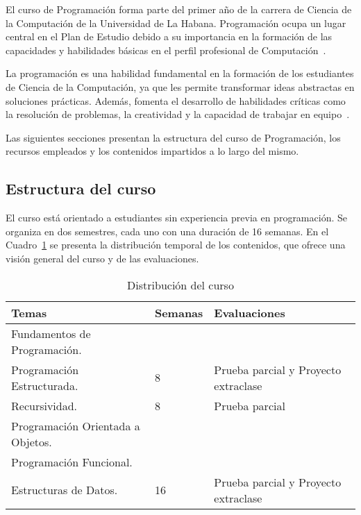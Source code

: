 El curso de Programación forma parte del primer año de la carrera de Ciencia de la Computación de la Universidad de La Habana. Programación ocupa un lugar central en el Plan de Estudio debido a su importancia en la formación de las capacidades y habilidades básicas en el perfil profesional de Computación~\cite{plan_estudio_e_2017}.

La programación es una habilidad fundamental en la formación de los estudiantes de Ciencia de la Computación, ya que les permite transformar ideas abstractas en soluciones prácticas. Además, fomenta el desarrollo de habilidades críticas como la resolución de problemas, la creatividad y la capacidad de trabajar en equipo~\cite{plan_estudio_e_2017}.

Las siguientes secciones presentan la estructura del curso de Programación, los recursos empleados y los contenidos impartidos a lo largo del mismo.

\subsection{Estructura del curso}

El curso está orientado a estudiantes sin experiencia previa en programación. Se organiza en dos semestres, cada uno con una duración de 16 semanas. En el Cuadro~\ref{tab:course_distribution} se presenta la distribución temporal de los contenidos, que ofrece una visión general del curso y de las evaluaciones.

\begin{table}[h!]
    \centering
    \begin{tabular}{|p{6.5cm}|p{2cm}|p{3.5cm}|}
    \hline
    \textbf{Temas} & \textbf{Semanas} & \textbf{Evaluaciones} \\ \hline
    \raggedright Fundamentos de Programación. \\ Programación Estructurada. 
    & 8 & Prueba parcial y Proyecto extraclase \\ \hline
    \raggedright Recursividad.
    & 8 & Prueba parcial \\ \hline
    \raggedright Programación Orientada a Objetos. \\ Programación Funcional. \\ Estructuras de Datos. 
    & 16 & Prueba parcial y Proyecto extraclase \\ \hline
    \end{tabular}
    \caption{Distribución del curso}\label{tab:course_distribution}
\end{table}
    

